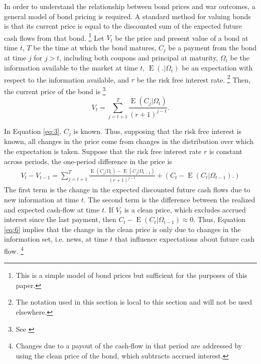 \documentclass[11pt, oneside, article]{memoir}
\DeclareMathOperator{\E}{E}
\begin{document}
In order to understand the relationship between bond prices and war outcomes, a general model of bond pricing is required.
A standard method for valuing bonds is that its current price is equal to the discounted sum of the expected future cash flows from that bond.%
\footnote{This is a simple model of bond prices but sufficient for the purposes of this paper.} %
Let $V_{t}$ be the price and present value of a bond at time $t$, 
$T$ be the time at which the bond matures, 
$C_{j}$ be a payment from the bond at time $j$ for $j > t$, including both coupons and principal at maturity,
$\Omega_{t}$ be the information available to the market at time $t$,
$\E(. | \Omega_{t})$ be an expectation with respect to the information available,
and $r$ be the risk free interest rate.%
\footnote{The notation used in this section is local to this section and will not be used elsewhere.}
Then, the current price of the bond is%
\footnote{See \textcites{Fons1987}{Merrick2001}{Chan-Lau2006}}
\begin{equation}
  \label{eq:3}
  V_{t} = \sum_{j = t + 1}^{T} \frac{\E ( C_{j} | \Omega_{t})}{(r + 1)^{j - t}} \text{.}
\end{equation}

In Equation \eqref{eq:3}, $C_{j}$ is known.
Thus, supposing that the risk free interest is known, all changes in the price come from changes in the distribution over which the expectation is taken.
Suppose that the risk free interest rate $r$ is constant across periods, the one-period difference in the price is
\begin{align}
  \label{eq:6}
  V_{t} - V_{t - 1} =
  \sum_{j = t + 1}^{T} \frac{\E ( C_{j} | \Omega_{t}) - \E (C_{j} | \Omega_{t - 1})}{(r + 1)^{j - t}}
  + \left(
    C_{t} - \E (C_{t} | \Omega_{t - 1}) \text{.}
  \right)
\end{align}
The first term is the change in the expected discounted future cash flows due to new information at time $t$.
The second term is the difference between the realized and expected cash-flow at time $t$.
If $V_{t}$ is a  clean price, which excludes accrued interest since the last payment, then $C_{t} - \E(C_{t} | \Omega_{t-1}) \approx 0$. 
Thus, Equation \eqref{eq:6} implies that the change in the clean price is only due to changes in the information set, i.e. news, at time $t$ that influence expectations about future cash flow.%
\footnote{Changes due to a payout of the cash-flow in that period are addressed by using the clean price of the bond, which subtracts accrued interest.}
\end{document}
